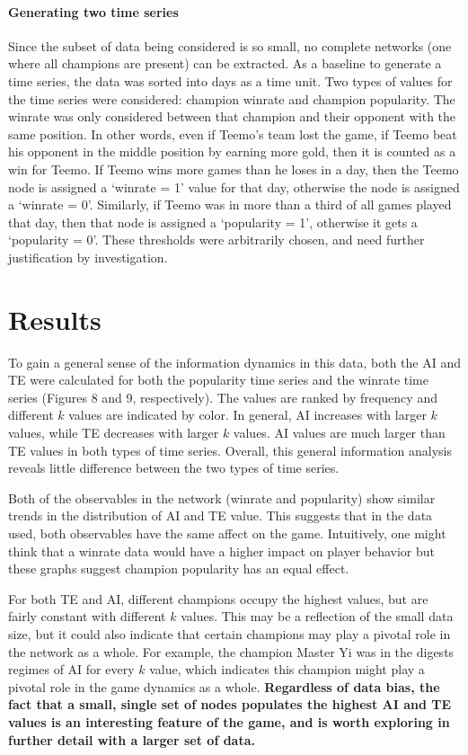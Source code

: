 \documentclass[twoside]{article}
\begin{document}
\begin{multicols}{2}
\paragraph{Generating two time series}Since the subset of data being considered is so small, no complete networks (one where all champions are present) can be extracted. As a baseline to generate a time series, the data was sorted into days as a time unit. Two types of values for the time series were considered: champion winrate and champion popularity. The winrate was only considered between that champion and their opponent with the same position. In other words, even if Teemo's team lost the game, if Teemo beat his opponent in the middle position by earning more gold, then it is counted as a win for Teemo. If Teemo wins more games than he loses in a day, then the Teemo node is assigned a `winrate = 1' value for that day, otherwise the node is assigned a `winrate = 0'. Similarly, if Teemo was in more than a third of all games played that day, then that node is assigned a `popularity = 1', otherwise it gets a `popularity = 0'. These thresholds were arbitrarily chosen, and need further justification by investigation.


\section{Results}

To gain a general sense of the information dynamics in this data, both the AI and TE were calculated for both the popularity time series and the winrate time series (Figures 8 and 9, respectively). The values are ranked by frequency and different $k$ values are indicated by color. In general, AI increases with larger $k$ values, while TE decreases with larger $k$ values. AI values are much larger than TE values in both types of time series. Overall, this general information analysis reveals little difference between the two types of time series. 

Both of the observables in the network (winrate and popularity) show similar trends in the distribution of AI and TE value. This suggests that in the data used, both observables have the same affect on the game. Intuitively, one might think that a winrate data would have a higher impact on player behavior but these graphs suggest champion popularity has an equal effect. 

For both TE and AI, different champions occupy the highest values, but are fairly constant with different $k$ values. This may be a reflection of the small data size, but it could also indicate that certain champions may play a pivotal role in the network as a whole. For example, the champion Master Yi was in the digests regimes of AI for every $k$ value, which indicates this champion might play a pivotal role in the game dynamics as a whole. \textbf{Regardless of data bias, the fact that a small, single set of nodes populates the highest AI and TE values is an interesting feature of the game, and is worth exploring in further detail with a larger set of data.}


\end{multicols}
\end{document}
